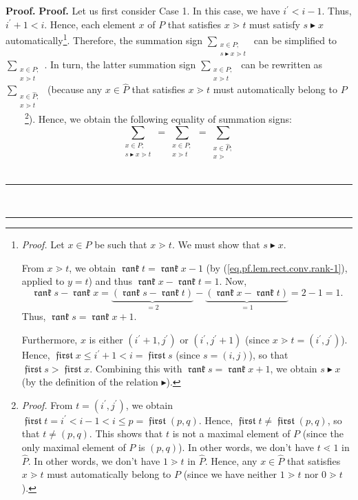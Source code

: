 \documentclass[numbers=enddot,12pt,final,onecolumn,notitlepage]{scrartcl}%
\theoremstyle{definition}
\newenvironment{verlong}{}{}
\DeclareMathOperator{\first}{\mathfrak{first}}
\DeclareMathOperator{\rank}{\mathfrak{rank}}
\newenvironment{proof}[1][Proof]{\noindent\textbf{#1.} }{\ \rule{0.5em}{0.5em}}
\let\sumnonlimits\sum
\renewcommand{\sum}{\sumnonlimits\limits}
\begin{document}
\begin{proof}
\begin{proof}
\begin{verlong}
Let us first consider Case 1. In this case, we have $i^{\prime}<i-1$. Thus,
$i^{\prime}+1<i$. Hence, each element $x$ of $P$ that satisfies $x\gtrdot t$
must satisfy $s\blacktriangleright x$ automatically\footnote{\textit{Proof.}
Let $x\in P$ be such that $x\gtrdot t$. We must show that
$s\blacktriangleright x$.
\par
From $x\gtrdot t$, we obtain $\rank t=\rank x-1$ (by
(\ref{eq.pf.lem.rect.conv.rank-1}), applied to $y=t$) and thus
$\rank x-\rank
t=1$. Now,%
\[
\rank s-\rank x=\underbrace{\left(  \rank s-\rank t\right)  }_{=2}%
-\underbrace{\left(  \rank x-\rank t\right)  }_{=1}=2-1=1.
\]
Thus, $\rank s=\rank x+1$.
\par
Furthermore, $x$ is either $\left(  i^{\prime}+1,j^{\prime}\right)  $ or
$\left(  i^{\prime},j^{\prime}+1\right)  $ (since $x\gtrdot t=\left(
i^{\prime},j^{\prime}\right)  $). Hence, $\first x\leq i^{\prime}+1<i=\first
s$ (since $s=\left(  i,j\right)  $), so that $\first s>\first x$. Combining
this with $\rank s=\rank x+1$, we obtain $s\blacktriangleright x$ (by the
definition of the relation $\blacktriangleright$).}. Therefore, the summation
sign $\sum_{\substack{x\in P;\\s\blacktriangleright x\gtrdot t}}$ can be
simplified to $\sum_{\substack{x\in P;\\x\gtrdot t}}$. In turn, the latter
summation sign $\sum_{\substack{x\in P;\\x\gtrdot t}}$ can be rewritten as
$\sum_{\substack{x\in\widehat{P};\\x\gtrdot t}}$ (because any $x\in
\widehat{P}$ that satisfies $x\gtrdot t$ must automatically belong to
$P$\ \ \ \ \footnote{\textit{Proof.} From $t=\left(  i^{\prime},j^{\prime
}\right)  $, we obtain $\first t=i^{\prime}<i-1<i\leq p=\first\left(
p,q\right)  $. Hence, $\first t\neq\first\left(  p,q\right)  $, so that
$t\neq\left(  p,q\right)  $. This shows that $t$ is not a maximal element of
$P$ (since the only maximal element of $P$ is $\left(  p,q\right)  $). In
other words, we don't have $t\lessdot1$ in $\widehat{P}$. In other words, we
don't have $1\gtrdot t$ in $\widehat{P}$. Hence, any $x\in\widehat{P}$ that
satisfies $x\gtrdot t$ must automatically belong to $P$ (since we have neither
$1\gtrdot t$ nor $0\gtrdot t$).}). Hence, we obtain the following equality of
summation signs:%
\[
\sum_{\substack{x\in P;\\s\blacktriangleright x\gtrdot t}}=\sum
_{\substack{x\in P;\\x\gtrdot t}}=\sum_{\substack{x\in\widehat{P};\\x\gtrdot
}}\]
\end{verlong}
\end{proof}
\end{proof}
\end{document}

